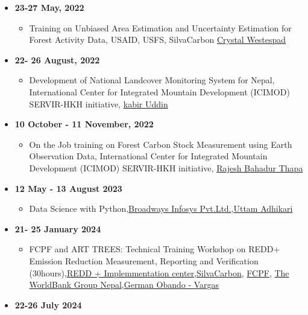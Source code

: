 \documentclass[
]{article}
\providecommand{\tightlist}{%
  \setlength{\itemsep}{0pt}\setlength{\parskip}{0pt}}
\begin{document}
\begin{itemize}
\tightlist
\item
  \textbf{23-27 May, 2022}

  \begin{itemize}
  \tightlist
  \item
    Training on Unbiased Area Estimation and Uncertainty Estimation for
    Forest Activity Data, USAID, USFS, SilvaCarbon
    \href{https://crystal-wespestad.com/}{Crystal Westespad}
  \end{itemize}
\item
  \textbf{22- 26 August, 2022}

  \begin{itemize}
  \tightlist
  \item
    Development of National Landcover Monitoring System for Nepal,
    International Center for Integrated Mountain Development (ICIMOD)
    SERVIR-HKH initiative,
    \href{https://www.icimod.org/team/kabir-uddin}{kabir Uddin}
  \end{itemize}
\item
  \textbf{10 October - 11 November, 2022}

  \begin{itemize}
  \tightlist
  \item
    On the Job training on Forest Carbon Stock Measurement using Earth
    Observation Data, International Center for Integrated Mountain
    Development (ICIMOD) SERVIR-HKH initiative,
    \href{https://www.icimod.org/team/rajesh-bahadur-thapa/}{Rajesh
    Bahadur Thapa}
  \end{itemize}
\item
  \textbf{12 May - 13 August 2023}

  \begin{itemize}
  \tightlist
  \item
    Data Science with
    Python,\href{https://broadwayinfosys.com/}{Broadways Infosys
    Pvt.Ltd.},\href{https://www.linkedin.com/in/uttam-adhikari-30a53660/?originalSubdomain=np}{Uttam
    Adhikari}
  \end{itemize}
\item
  \textbf{21- 25 January 2024}

  \begin{itemize}
  \tightlist
  \item
    FCPF and ART TREES: Technical Training Workshop on REDD+ Emission
    Reduction Measurement, Reporting and Verification
    (30hours),\href{https://redd.gov.np/}{REDD + Implemmentation
    center},\href{https://www.silvacarbon.org/}{SilvaCarbon},
    \href{https://www.forestcarbonpartnership.org/sites/default/files/documents/nepal_ermr_ghg_accounting_nov_2023_final.pdf}{FCPF},
    \href{https://www.worldbank.org/en/home}{The WorldBank Group
    Nepal},\href{https://www.linkedin.com/in/german-obando-vargas-24b70319/?originalSubdomain=cr}{German
    Obando - Vargas}
  \end{itemize}
\item
  \textbf{22-26 July 2024}


\end{itemize}
\end{document}
